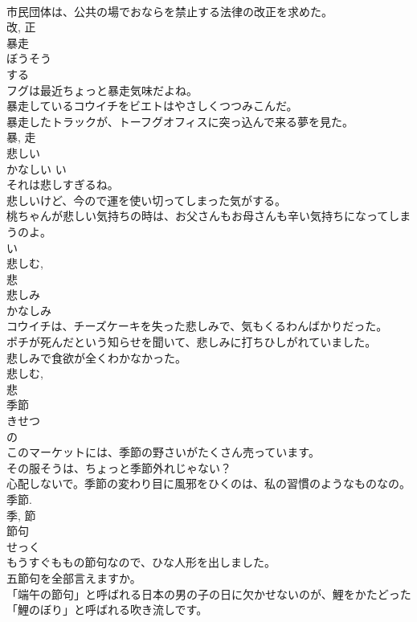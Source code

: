\documentclass[8pt]{extreport}
\begin{document}
\begin{CJK}{UTF8}{min}
\\	市民団体は、公共の場でおならを禁止する法律の改正を求めた。	
\\	改, 正	
\\	暴走	
\\	ぼうそう	
\\	する 
\\	フグは最近ちょっと暴走気味だよね。	
\\	暴走しているコウイチをビエトはやさしくつつみこんだ。	
\\	暴走したトラックが、トーフグオフィスに突っ込んで来る夢を見た。	
\\	暴, 走	
\\	悲しい	
\\	かなしい	い 
\\	それは悲しすぎるね。	
\\	悲しいけど、今ので運を使い切ってしまった気がする。	
\\	桃ちゃんが悲しい気持ちの時は、お父さんもお母さんも辛い気持ちになってしまうのよ。	
\\	い 
\\	悲しむ, 
\\	悲	
\\	悲しみ	
\\	かなしみ	
\\	コウイチは、チーズケーキを失った悲しみで、気もくるわんばかりだった。	
\\	ポチが死んだという知らせを聞いて、悲しみに打ちひしがれていました。	
\\	悲しみで食欲が全くわかなかった。	
\\	悲しむ, 
\\	悲	
\\	季節	
\\	きせつ	
\\	の 
\\	このマーケットには、季節の野さいがたくさん売っています。	
\\	その服そうは、ちょっと季節外れじゃない？	
\\	心配しないで。季節の変わり目に風邪をひくのは、私の習慣のようなものなの。	
\\	季節.	
\\	季, 節	
\\	節句	
\\	せっく	
\\	もうすぐももの節句なので、ひな人形を出しました。	
\\	五節句を全部言えますか。	
\\	「端午の節句」と呼ばれる日本の男の子の日に欠かせないのが、鯉をかたどった「鯉のぼり」と呼ばれる吹き流しです。	

\end{CJK}
\end{document}
